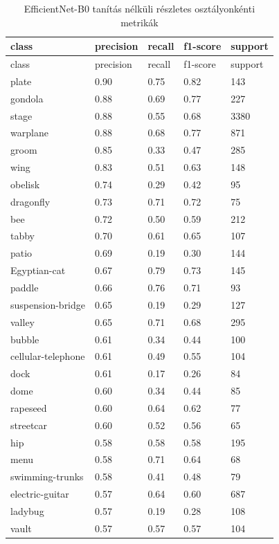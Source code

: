 \begin{center}
\begin{longtable}{lllll}
\caption{EfficientNet-B0 tanítás nélküli részletes osztályonkénti metrikák}\label{tab:phase1_EfficientNet-B0_class_table}\\
\toprule
class & precision & recall & f1-score & support \\
\midrule
\endfirsthead
\toprule
class & precision & recall & f1-score & support \\
\midrule
\endhead
plate & 0.90 & 0.75 & 0.82 & 143 \\
gondola & 0.88 & 0.69 & 0.77 & 227 \\
stage & 0.88 & 0.55 & 0.68 & 3380 \\
warplane & 0.88 & 0.68 & 0.77 & 871 \\
groom & 0.85 & 0.33 & 0.47 & 285 \\
wing & 0.83 & 0.51 & 0.63 & 148 \\
obelisk & 0.74 & 0.29 & 0.42 & 95 \\
dragonfly & 0.73 & 0.71 & 0.72 & 75 \\
bee & 0.72 & 0.50 & 0.59 & 212 \\
tabby & 0.70 & 0.61 & 0.65 & 107 \\
patio & 0.69 & 0.19 & 0.30 & 144 \\
Egyptian-cat & 0.67 & 0.79 & 0.73 & 145 \\
paddle & 0.66 & 0.76 & 0.71 & 93 \\
suspension-bridge & 0.65 & 0.19 & 0.29 & 127 \\
valley & 0.65 & 0.71 & 0.68 & 295 \\
bubble & 0.61 & 0.34 & 0.44 & 100 \\
cellular-telephone & 0.61 & 0.49 & 0.55 & 104 \\
dock & 0.61 & 0.17 & 0.26 & 84 \\
dome & 0.60 & 0.34 & 0.44 & 85 \\
rapeseed & 0.60 & 0.64 & 0.62 & 77 \\
streetcar & 0.60 & 0.52 & 0.56 & 65 \\
hip & 0.58 & 0.58 & 0.58 & 195 \\
menu & 0.58 & 0.71 & 0.64 & 68 \\
swimming-trunks & 0.58 & 0.41 & 0.48 & 79 \\
electric-guitar & 0.57 & 0.64 & 0.60 & 687 \\
ladybug & 0.57 & 0.19 & 0.28 & 108 \\
vault & 0.57 & 0.57 & 0.57 & 104 \\

\end{longtable}
\end{center}
